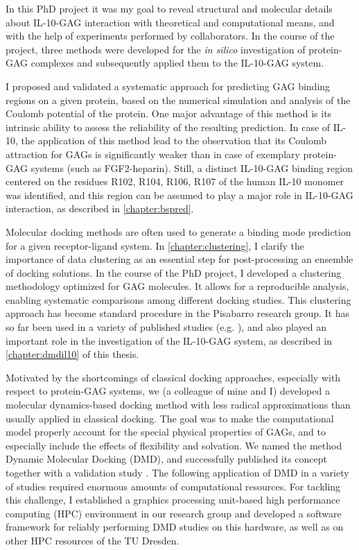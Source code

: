 In this PhD project it was my goal to reveal structural and molecular details
about IL-10-GAG interaction with theoretical and computational means, and with
the help of experiments performed by collaborators. In the course of the
project, three methods were developed for the \textit{in silico} investigation
of protein-GAG complexes and subsequently applied them to the IL-10-GAG system.

I proposed and validated a systematic approach for predicting GAG binding
regions on a given protein, based on the numerical simulation and analysis of
the Coulomb potential of the protein. One major advantage of this method is its
intrinsic ability to assess the reliability of the resulting prediction. In case
of IL-10, the application of this method lead to the observation that its
Coulomb attraction for GAGs is significantly weaker than in case of exemplary
protein-GAG systems (such as FGF2-heparin). Still, a distinct IL-10-GAG binding
region centered on the residues R102, R104, R106, R107 of the human IL-10
monomer was identified, and this region can be assumed to play a major role in
IL-10-GAG interaction, as described in \cref{chapter:bspred}.

Molecular docking methods are often used to generate a binding mode prediction
for a given receptor-ligand system. In \cref{chapter:clustering}, I clarify the
importance of data clustering as an essential step for post-processing an
ensemble of docking solutions. In the course of the PhD project, I developed a
clustering methodology optimized for GAG molecules. It allows for a reproducible
analysis, enabling systematic comparisons among different docking studies. This
clustering approach has become standard procedure in the Pisabarro research
group. It has so far been used in a variety of published studies (e.g.
\cite{franz_cathepsin_2013}), and also played an important role in the
investigation of the IL-10-GAG system, as described in \cref{chapter:dmdil10} of
this thesis.

Motivated by the shortcomings of classical docking approaches, especially with
respect to protein-GAG systems, we (a colleague of mine and I) developed a
molecular dynamics-based docking method with less radical approximations than
usually applied in classical docking. The goal was to make the computational
model properly account for the special physical properties of GAGs, and to
especially include the effects of flexibility and solvation. We named the method
Dynamic Molecular Docking (DMD), and successfully published its concept together
with a validation study \cite{dmd_samsonov_gehrcke_2014}. The following
application of DMD in a variety of studies required enormous amounts of
computational resources. For tackling this challenge, I established a graphics
processing unit-based high performance computing (HPC) environment in our
research group and developed a software framework for reliably performing DMD
studies on this hardware, as well as on other HPC resources of the TU Dresden.

